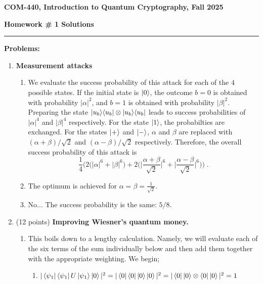 \documentclass[12pt]{article}
\newcommand{\header}[1]{\begin{center} {\large\bf #1} \end{center}}
\begin{document}
\header{COM-440, Introduction to Quantum Cryptography, Fall 2025}
{\bf Homework \# 1 Solutions} 


\medskip

\hrule

 
\medskip
{\bf Problems:}

\begin{enumerate}
		


\item {\bf Measurement attacks}

\begin{enumerate}
\item We evaluate the success probability of this attack for each of the $4$ possible states. If the initial state is $\ket{0}$, the outcome $b=0$ is obtained with probability $|\alpha|^2$, and $b=1$ is obtained with probability $|\beta|^2$. Preparing the state $\ket{u_b}\!\bra{u_b} \otimes \ket{u_b}\!\bra{u_b}$ leads to success probabilities of $|\alpha|^4$ and $|\beta|^4$ respectively. For the state $\ket{1}$, the probabilties are exchanged. For the states $\ket{+}$ and $\ket{-}$, $\alpha$ and $\beta$ are replaced with $(\alpha + \beta)/\sqrt{2}$ and $(\alpha-\beta)/\sqrt{2}$ respectively. Therefore, the overall success probability of this attack is 
\[ \frac{1}{4}\Big( 2 \big( |\alpha|^6 + |\beta|^6\big) + 2\Big( \Big| \frac{\alpha + \beta}{\sqrt{2}}\Big|^6
+\Big| \frac{\alpha - \beta}{\sqrt{2}}\Big|^6\Big)\Big)\;.\]
\item The optimum is achieved for $\alpha=\beta=\frac{1}{\sqrt{2}}$. 
\item No... The success probability is the same: $5/8$. 
\end{enumerate}



\item (12 points) {\bf Improving Wiesner's quantum money.}

\begin{enumerate}
\item 
This boils down to a lengthy calculation. Namely, we will evaluate each of the six terms of the sum individually below and then add them together with the appropriate weighting. We begin;
\begin{enumerate}
    \item $|\bra{\psi_1}\bra{\psi_1}U\ket{\psi_1} \ket{0}|^2 = |\bra{0}\bra{0}\ket{0}\ket{0}|^2 = |\bra{0}\ket{0}\otimes \bra{0}\ket{0}|^2 = 1 $
    

\end{enumerate}
\end{enumerate}
\end{enumerate}
\end{document}
